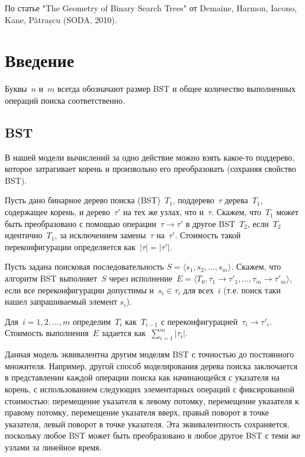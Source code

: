 \documentclass[a4paper,11pt]{article}
\begin{document}
По статье "The Geometry of Binary Search Trees" от Demaine, Harmon, Iacono, Kane, Pătrașcu (SODA, 2010).

\section{Введение}

Буквы~$n$ и~$m$ всегда обозначают размер BST и общее количество выполненных операций поиска соответственно.

\subsection{BST}

В нашей модели вычислений за одно действие можно взять какое-то поддерево, которое затрагивает корень и произвольно его преобразовать (сохраняя свойство BST).
\begin{definition}[Переконфигурация]
Пусть дано бинарное дерево поиска (BST)~$T_1$, поддерево~$\tau$ дерева~$T_1$, содержащее корень, и дерево~$\tau'$ на тех же узлах, что и~$\tau$. Скажем, что~$T_1$ может быть преобразовано с помощью операции~$\tau \to \tau'$ в другое BST~$T_2$, если~$T_2$ идентично~$T_1$, за исключением замены~$\tau$ на~$\tau'$. Стоимость такой переконфигурации определяется как~$|\tau| = |\tau'|$.
\end{definition}

\begin{definition}
Пусть задана поисковая последовательность $S = \langle s_1, s_2, \dots, s_m \rangle$. Скажем, что алгоритм BST выполняет~$S$ через исполнение~$E = \langle T_0, \tau_1 \to \tau'_1, \dots, \tau_m \to \tau'_m \rangle$, если все переконфигурации допустимы и~$s_i \in \tau_i$ для всех~$i$ (т.е. поиск таки нашел запрашиваемый элемент $s_i$). 

Для~$i = 1, 2, \dots, m$ определим~$T_i$ как~$T_{i-1}$ с переконфигурацией~$\tau_i \to \tau'_i$. Стоимость выполнения~$E$ задается как~$\sum_{i=1}^{m} |\tau_i|$.
\end{definition}


Данная модель эквивалентна другим моделям BST с точностью до постоянного множителя. Например, другой способ моделирования дерева поиска заключается в представлении каждой операции поиска как начинающейся с указателя на корень, с использованием следующих элементарных операций с фиксированной стоимостью: перемещение указателя к левому потомку, перемещение указателя к правому потомку, перемещение указателя вверх, правый поворот в точке указателя, левый поворот в точке указателя. 
Эта эквивалентность сохраняется, поскольку любое BST может быть преобразовано в любое другое BST с теми же узлами за линейное время.
\end{document}
